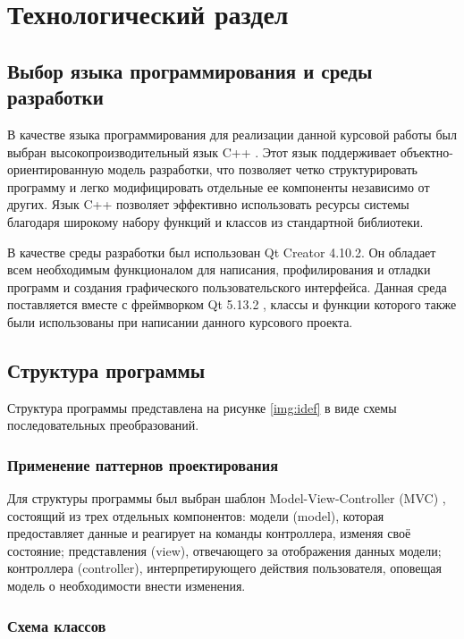 \chapter{Технологический раздел}

\section{Выбор языка программирования и среды разработки}

В качестве языка программирования для реализации данной курсовой работы был выбран высокопроизводительный язык C++ \cite{cpp17}.
Этот язык поддерживает объектно-ориентированную модель разработки, что позволяет четко структурировать программу и легко модифицировать отдельные ее компоненты независимо от других.
Язык C++ позволяет эффективно использовать ресурсы системы благодаря широкому набору функций и классов из стандартной библиотеки.

В качестве среды разработки был использован Qt Creator 4.10.2.
Он обладает всем необходимым функционалом для написания, профилирования и отладки программ и создания графического пользовательского интерфейса.
Данная среда поставляется вместе с фреймворком Qt 5.13.2 \cite{qt}, классы и функции которого также были использованы при написании данного курсового проекта.

\section{Структура программы}

Структура  программы  представлена  на  рисунке \ref{img:idef} в виде схемы последовательных преобразований.


\subsection{Применение паттернов проектирования}

Для структуры программы был выбран шаблон Model-View-Controller (MVC) \cite{Gamma}, состоящий из трех отдельных компонентов: модели (model), которая предоставляет  данные  и  реагирует  на  команды контроллера, изменяя своё состояние; представления (view), отвечающего за отображения данных модели; контроллера (controller), интерпретирующего действия пользователя, оповещая модель о необходимости внести изменения.

\subsection{Схема классов}

